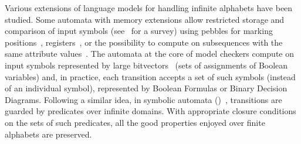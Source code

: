 Various extensions of language models for handling infinite alphabets have been studied.
Some automata 
with memory extensions
allow restricted storage and comparison of input symbols
(see~\cite{Segoufin06csl} for a survey)
using pebbles for marking positions~\cite{NevenSchwentickVianu04FSMinfinite},
registers~\cite{KaminskiFrancez94},
or %
the possibility to compute on subsequences
with the same attribute values~\cite{Bojanczyk11FO2}. %
%
%
The automata at the core of model checkers
compute on input symbols represented by large bitvectors~\cite{Vardi07ciaa} %
(sets of assignments of Boolean variables) %
and, in practice,  %
each transition accepts a set of such symbols (instead of an individual symbol),
represented by Boolean Formulas or Binary Decision Diagrams.
%
Following a similar idea, %
in symbolic automata (\SA)~\cite{dAntoniVeanes17CAV,dAntoni21CACM},
transitions are guarded by predicates over infinite  domains.
With appropriate closure conditions on the sets of such predicates, %
all the good properties enjoyed over finite alphabets are preserved.

